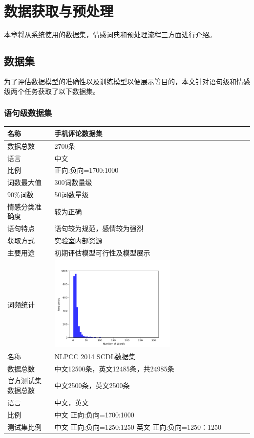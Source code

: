 \chapter{数据获取与预处理}
本章将从系统使用的数据集，情感词典和预处理流程三方面进行介绍。
\section{数据集}
为了评估数据模型的准确性以及训练模型以便展示等目的，本文针对语句级和情感级两个任务获取了以下数据集。
\subsection{语句级数据集}
\begin{center}
\begin{longtabu} to 0.8\textwidth{X|X[3]}
\hline
名称 & 手机评论数据集\\
\hline
数据总数 & 2700条\\
语言 & 中文\\
比例 & 正向:负向=1700:1000\\
词数最大值 & 300词数量级\\
90\%词数 & 50词数量级\\
情感分类准确度 & 较为正确\\
语句特点 & 语句较为规范，感情较为强烈\\
获取方式 & 实验室内部资源\\
主要用途 & 初期评估模型可行性及模型展示\\
词频统计 & \includegraphics[width=0.6\textwidth, height=0.3\textwidth]{graphic/wordsnum_mobile.png}\\
\hline
名称 & NLPCC 2014 SCDL数据集\\
\hline
数据总数 & 中文12500条，英文12485条，共24985条\\
官方测试集数据总数 & 中文2500条，英文2500条\\
语言 & 中文，英文\\
比例 & 中文 正向:负向=1700:1000\\
测试集比例 & 中文 正向:负向=1250:1250 英文 正向:负向=1250：1250\\

\end{longtabu}
\end{center}
